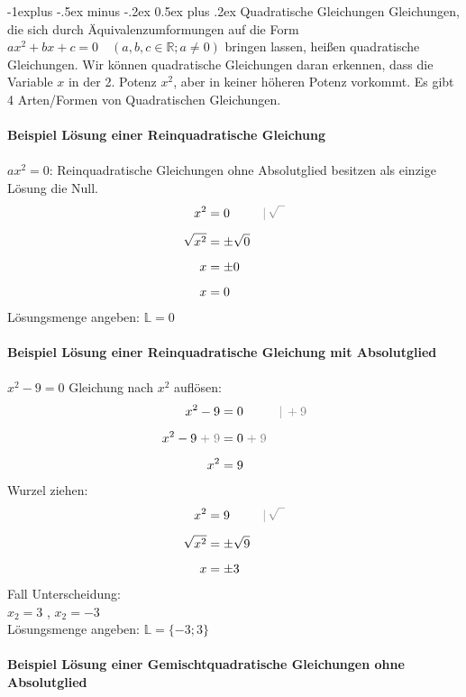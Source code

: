 \documentclass[10pt,landscape]{article}
\makeatletter
\renewcommand{\subsection}{\@startsection{subsection}{2}{0mm}%
                                {-1explus -.5ex minus -.2ex}%
                                {0.5ex plus .2ex}%
                                {\normalfont\normalsize\bfseries}}
\makeatother
\begin{document}
\begin{multicols}{3}
    \subsection{Quadratische Gleichungen}
    Gleichungen, die sich durch Äquivalenzumformungen auf die Form $ax^2 + bx + c = 0 \quad (a, b, c \in \mathbb{R}; a \neq 0)$
    bringen lassen, heißen quadratische Gleichungen. Wir können quadratische Gleichungen daran erkennen, dass die Variable $x$ in der 2. Potenz $x^2$, aber in keiner höheren Potenz vorkommt. Es gibt 4 Arten/Formen von Quadratischen Gleichungen.\\~\\
    \textbf{Beispiel Lösung einer Reinquadratische Gleichung} \\~\\
    $ax^2 = 0$: Reinquadratische Gleichungen ohne Absolutglied besitzen als einzige Lösung die Null.
    \begin{align*} x^2 &= 0 &&{\color{gray}|\, \sqrt{\phantom{0}}} \\[5px] \sqrt{x^2} &= \pm\sqrt{0} \\[5px] x &= \pm 0 \\[5px] x &= 0 \end{align*}
    Lösungsmenge angeben:  $\mathbb{L} =  0$ \\~\\
    \textbf{Beispiel Lösung einer Reinquadratische Gleichung mit Absolutglied} \\~\\
    $x^2 - 9 = 0$ Gleichung nach $x^2$ auflösen: \\
    \begin{align*} x^2 - 9 &= 0 &&{\color{gray}|\, +9} \\[5px] x^2 - 9 {\color{gray}\;+\;9} &= 0 {\color{gray}\;+\;9} \\[5px] x^2 &= 9 \end{align*}
    Wurzel ziehen:
    \begin{align*} x^2 &= 9 &&{\color{gray}|\, \sqrt{\phantom{9}}} \\[5px] \sqrt{x^2} &= \pm\sqrt{9} \\[5px] x &= \pm 3 \end{align*}
    Fall Unterscheidung: \\
    $x_2 = 3$ , $x_2 = -3$ \\
    Lösungsmenge angeben:  $    \mathbb{L} = \{-3; 3\}$ \\~\\
    \textbf{Beispiel Lösung einer Gemischtquadratische Gleichungen ohne Absolutglied} \\~\\

\end{multicols}
\end{document}
